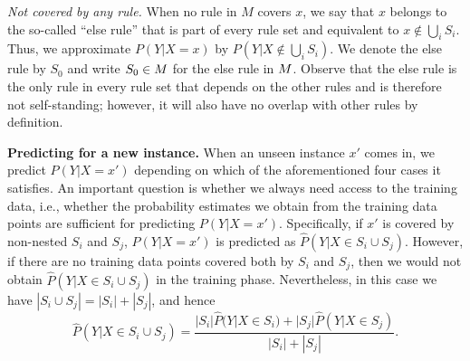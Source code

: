  
\smallskip \noindent
\emph{Not covered by any rule.}
When no rule in $M$ covers $x$, we say that $x$ belongs to the so-called ``else rule'' that is part of every rule set and equivalent to $x \notin \bigcup_{i} S_i$. Thus, we approximate $P(Y|X=x)$ by $P(Y | X \notin \bigcup_{i} S_i)$. We denote the else rule by $S_0$ and write $S_0 \in M$ for the else rule in $M$. Observe that the else rule is the only rule in every rule set that depends on the other rules and is therefore not self-standing; however, it will also have no overlap with other rules by definition.

\medskip \noindent
\textbf{Predicting for a new instance.} \label{subsubsec:new_data}
When an unseen instance $x'$ comes in, we predict $P(Y|X=x')$ depending on which of the aforementioned four cases it satisfies. An important question is whether we always need access to the training data, i.e., whether the probability estimates we obtain from the training data points are sufficient for predicting $P(Y|X=x')$.
Specifically, if $x'$ is covered by non-nested $S_i$ and $S_j$, $P(Y|X=x')$ is predicted as $\hat{P}(Y|X \in S_i \cup S_j)$. However, if there are no training data points covered both by $S_i$ and $S_j$, then we would not obtain $\hat{P}(Y|X \in S_i \cup S_j)$ in the training phase. Nevertheless, in this case we have  $|S_i \cup S_j| = |S_i| + |S_j|$, and hence
\begin{equation}
    \hat{P}(Y|X \in S_i \cup S_j) = \frac{|S_i| \hat{P}(Y|X\in S_i) + |S_j| \hat{P}(Y|X\in S_j)}{|S_i| + |S_j|}.
\end{equation}

